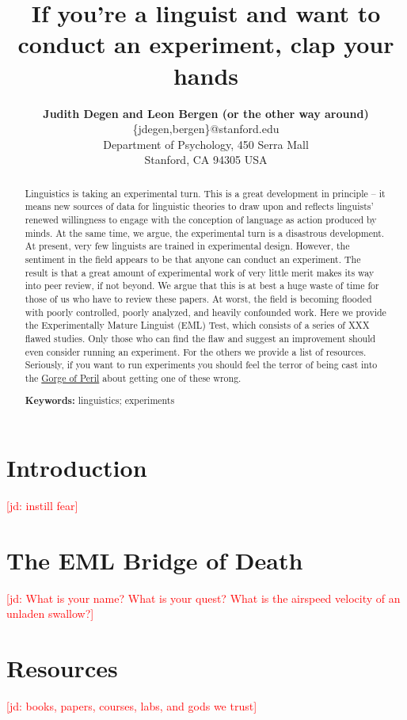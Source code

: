 \documentclass[11pt]{article}
\title{If you're a linguist and want to conduct an experiment, clap your hands}
\author{{\large \bf Judith Degen and Leon Bergen (or the other way around)} \\
  \{jdegen,bergen\}@stanford.edu\\
  Department of Psychology, 450 Serra Mall \\
  Stanford, CA 94305 USA}
\newcommand{\jd}[1]{\textcolor{Red}{[jd: #1]}}
\begin{document}
\maketitle


\begin{abstract}
Linguistics is taking an experimental turn. This is a great development in principle -- it means new sources of data for linguistic theories to draw upon and reflects linguists' renewed willingness to engage with the conception of language as action produced by minds. At the same time, we argue, the experimental turn is a disastrous development. At present, very few linguists are trained in experimental design. However, the sentiment in the field appears to be that anyone can conduct an experiment. The result is that a great amount of experimental work of very little merit makes its way into peer review, if not beyond. We argue that this is at best a huge waste of time for those of us who have to review these papers. At worst, the field is  becoming flooded with poorly controlled, poorly analyzed, and heavily confounded work. Here we provide the Experimentally Mature Linguist (EML) Test, which consists of a series of XXX flawed studies. Only those who can find the flaw and suggest an improvement should even consider running an experiment. For the others we provide a list of resources. Seriously, if you want to run experiments you should feel the terror of being cast into the \href{https://www.youtube.com/watch?v=cV0tCphFMr8}{Gorge of Peril} about getting one of these wrong. 


\textbf{Keywords:} 
linguistics; experiments
\end{abstract}

\section{Introduction}
\label{sec:intro}

\jd{instill fear}

\section{The EML Bridge of Death}
\label{sec:bod}

\jd{What is your name? What is your quest? What is the airspeed velocity of an unladen swallow?}

\section{Resources}

\jd{books, papers, courses, labs, and gods we trust}

%
%
%
%
\end{document}
